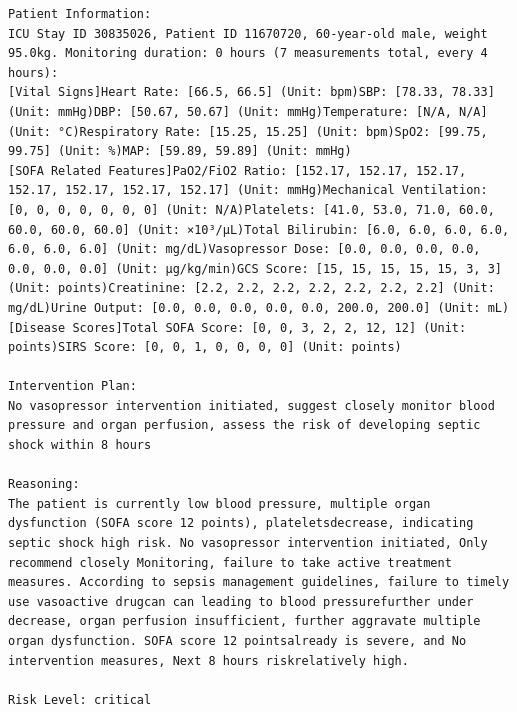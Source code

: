 \documentclass{article}
\begin{document}
\begin{lstlisting}[caption={Result for Patient 30835026}, label={lst:30835026}]
Patient Information:
ICU Stay ID 30835026, Patient ID 11670720, 60-year-old male, weight 95.0kg. Monitoring duration: 0 hours (7 measurements total, every 4 hours):
[Vital Signs]Heart Rate: [66.5, 66.5] (Unit: bpm)SBP: [78.33, 78.33] (Unit: mmHg)DBP: [50.67, 50.67] (Unit: mmHg)Temperature: [N/A, N/A] (Unit: °C)Respiratory Rate: [15.25, 15.25] (Unit: bpm)SpO2: [99.75, 99.75] (Unit: %)MAP: [59.89, 59.89] (Unit: mmHg)
[SOFA Related Features]PaO2/FiO2 Ratio: [152.17, 152.17, 152.17, 152.17, 152.17, 152.17, 152.17] (Unit: mmHg)Mechanical Ventilation: [0, 0, 0, 0, 0, 0, 0] (Unit: N/A)Platelets: [41.0, 53.0, 71.0, 60.0, 60.0, 60.0, 60.0] (Unit: ×10³/μL)Total Bilirubin: [6.0, 6.0, 6.0, 6.0, 6.0, 6.0, 6.0] (Unit: mg/dL)Vasopressor Dose: [0.0, 0.0, 0.0, 0.0, 0.0, 0.0, 0.0] (Unit: μg/kg/min)GCS Score: [15, 15, 15, 15, 15, 3, 3] (Unit: points)Creatinine: [2.2, 2.2, 2.2, 2.2, 2.2, 2.2, 2.2] (Unit: mg/dL)Urine Output: [0.0, 0.0, 0.0, 0.0, 0.0, 200.0, 200.0] (Unit: mL)
[Disease Scores]Total SOFA Score: [0, 0, 3, 2, 2, 12, 12] (Unit: points)SIRS Score: [0, 0, 1, 0, 0, 0, 0] (Unit: points)

Intervention Plan:
No vasopressor intervention initiated, suggest closely monitor blood pressure and organ perfusion, assess the risk of developing septic shock within 8 hours

Reasoning:
The patient is currently low blood pressure, multiple organ dysfunction (SOFA score 12 points), plateletsdecrease, indicating septic shock high risk. No vasopressor intervention initiated, Only recommend closely Monitoring, failure to take active treatment measures. According to sepsis management guidelines, failure to timely use vasoactive drugcan can leading to blood pressurefurther under decrease, organ perfusion insufficient, further aggravate multiple organ dysfunction. SOFA score 12 pointsalready is severe, and No intervention measures, Next 8 hours riskrelatively high.

Risk Level: critical
\end{lstlisting}
\end{document}
